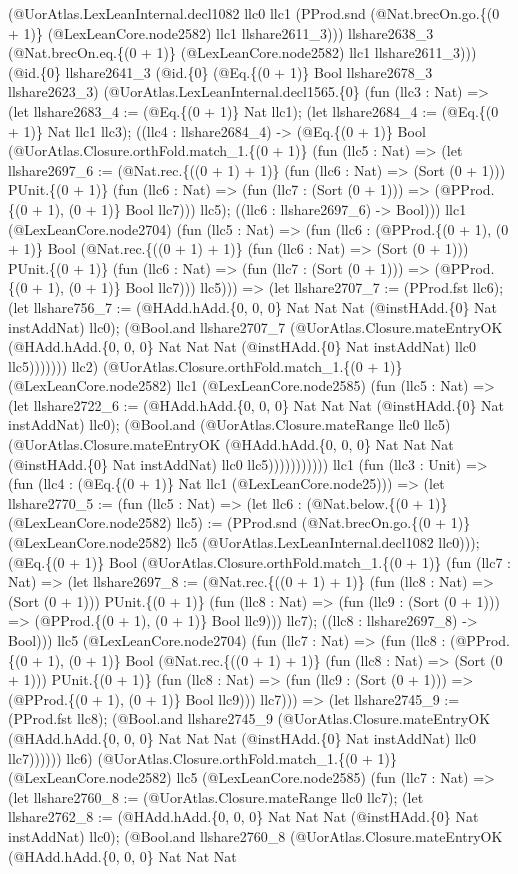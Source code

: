 \documentclass[11pt]{article}
\begin{document}
(@UorAtlas.LexLeanInternal.decl1082 llc0 llc1 (PProd.snd (@Nat.brecOn.go.\{(0 + 1)\} (@LexLeanCore.node2582) llc1 llshare2611\_3))) llshare2638\_3 (@Nat.brecOn.eq.\{(0 + 1)\} (@LexLeanCore.node2582) llc1 llshare2611\_3))) (@id.\{0\} llshare2641\_3 (@id.\{0\} (@Eq.\{(0 + 1)\} Bool llshare2678\_3 llshare2623\_3) (@UorAtlas.LexLeanInternal.decl1565.\{0\} (fun (llc3 : Nat) => (let llshare2683\_4 := (@Eq.\{(0 + 1)\} Nat llc1); (let llshare2684\_4 := (@Eq.\{(0 + 1)\} Nat llc1 llc3); ((llc4 : llshare2684\_4) -> (@Eq.\{(0 + 1)\} Bool (@UorAtlas.Closure.orthFold.match\_1.\{(0 + 1)\} (fun (llc5 : Nat) => (let llshare2697\_6 := (@Nat.rec.\{((0 + 1) + 1)\} (fun (llc6 : Nat) => (Sort (0 + 1))) PUnit.\{(0 + 1)\} (fun (llc6 : Nat) => (fun (llc7 : (Sort (0 + 1))) => (@PProd.\{(0 + 1), (0 + 1)\} Bool llc7))) llc5); ((llc6 : llshare2697\_6) -> Bool))) llc1 (@LexLeanCore.node2704) (fun (llc5 : Nat) => (fun (llc6 : (@PProd.\{(0 + 1), (0 + 1)\} Bool (@Nat.rec.\{((0 + 1) + 1)\} (fun (llc6 : Nat) => (Sort (0 + 1))) PUnit.\{(0 + 1)\} (fun (llc6 : Nat) => (fun (llc7 : (Sort (0 + 1))) => (@PProd.\{(0 + 1), (0 + 1)\} Bool llc7))) llc5))) => (let llshare2707\_7 := (PProd.fst llc6); (let llshare756\_7 := (@HAdd.hAdd.\{0, 0, 0\} Nat Nat Nat (@instHAdd.\{0\} Nat instAddNat) llc0); (@Bool.and llshare2707\_7 (@UorAtlas.Closure.mateEntryOK (@HAdd.hAdd.\{0, 0, 0\} Nat Nat Nat (@instHAdd.\{0\} Nat instAddNat) llc0 llc5))))))) llc2) (@UorAtlas.Closure.orthFold.match\_1.\{(0 + 1)\} (@LexLeanCore.node2582) llc1 (@LexLeanCore.node2585) (fun (llc5 : Nat) => (let llshare2722\_6 := (@HAdd.hAdd.\{0, 0, 0\} Nat Nat Nat (@instHAdd.\{0\} Nat instAddNat) llc0); (@Bool.and (@UorAtlas.Closure.mateRange llc0 llc5) (@UorAtlas.Closure.mateEntryOK (@HAdd.hAdd.\{0, 0, 0\} Nat Nat Nat (@instHAdd.\{0\} Nat instAddNat) llc0 llc5))))))))))) llc1 (fun (llc3 : Unit) => (fun (llc4 : (@Eq.\{(0 + 1)\} Nat llc1 (@LexLeanCore.node25))) => (let llshare2770\_5 := (fun (llc5 : Nat) => (let llc6 : (@Nat.below.\{(0 + 1)\} (@LexLeanCore.node2582) llc5) := (PProd.snd (@Nat.brecOn.go.\{(0 + 1)\} (@LexLeanCore.node2582) llc5 (@UorAtlas.LexLeanInternal.decl1082 llc0))); (@Eq.\{(0 + 1)\} Bool (@UorAtlas.Closure.orthFold.match\_1.\{(0 + 1)\} (fun (llc7 : Nat) => (let llshare2697\_8 := (@Nat.rec.\{((0 + 1) + 1)\} (fun (llc8 : Nat) => (Sort (0 + 1))) PUnit.\{(0 + 1)\} (fun (llc8 : Nat) => (fun (llc9 : (Sort (0 + 1))) => (@PProd.\{(0 + 1), (0 + 1)\} Bool llc9))) llc7); ((llc8 : llshare2697\_8) -> Bool))) llc5 (@LexLeanCore.node2704) (fun (llc7 : Nat) => (fun (llc8 : (@PProd.\{(0 + 1), (0 + 1)\} Bool (@Nat.rec.\{((0 + 1) + 1)\} (fun (llc8 : Nat) => (Sort (0 + 1))) PUnit.\{(0 + 1)\} (fun (llc8 : Nat) => (fun (llc9 : (Sort (0 + 1))) => (@PProd.\{(0 + 1), (0 + 1)\} Bool llc9))) llc7))) => (let llshare2745\_9 := (PProd.fst llc8); (@Bool.and llshare2745\_9 (@UorAtlas.Closure.mateEntryOK (@HAdd.hAdd.\{0, 0, 0\} Nat Nat Nat (@instHAdd.\{0\} Nat instAddNat) llc0 llc7)))))) llc6) (@UorAtlas.Closure.orthFold.match\_1.\{(0 + 1)\} (@LexLeanCore.node2582) llc5 (@LexLeanCore.node2585) (fun (llc7 : Nat) => (let llshare2760\_8 := (@UorAtlas.Closure.mateRange llc0 llc7); (let llshare2762\_8 := (@HAdd.hAdd.\{0, 0, 0\} Nat Nat Nat (@instHAdd.\{0\} Nat instAddNat) llc0); (@Bool.and llshare2760\_8 (@UorAtlas.Closure.mateEntryOK (@HAdd.hAdd.\{0, 0, 0\} Nat Nat Nat 
\end{document}
